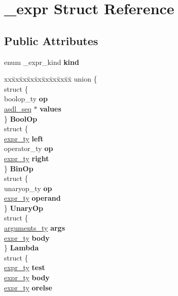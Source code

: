 \hypertarget{struct__expr}{}\section{\+\_\+expr Struct Reference}
\label{struct__expr}
\subsection*{Public Attributes}
\begin{DoxyCompactItemize}
\item 
enum \+\_\+expr\+\_\+kind {\bfseries kind}\hypertarget{struct__expr_a588eb2205de8b0b03e0edd5143a26cd0}{}\label{struct__expr_a588eb2205de8b0b03e0edd5143a26cd0}

\item 
\begin{tabbing}
xx\=xx\=xx\=xx\=xx\=xx\=xx\=xx\=xx\=\kill
union \{\\
\>struct \{\\
\>\>boolop\_ty {\bfseries op}\\
\>\>\hyperlink{structasdl__seq}{asdl\_seq} $\ast$ {\bfseries values}\\
\>\} {\bfseries BoolOp}\\
\>struct \{\\
\>\>\hyperlink{struct__expr}{expr\_ty} {\bfseries left}\\
\>\>operator\_ty {\bfseries op}\\
\>\>\hyperlink{struct__expr}{expr\_ty} {\bfseries right}\\
\>\} {\bfseries BinOp}\\
\>struct \{\\
\>\>unaryop\_ty {\bfseries op}\\
\>\>\hyperlink{struct__expr}{expr\_ty} {\bfseries operand}\\
\>\} {\bfseries UnaryOp}\\
\>struct \{\\
\>\>\hyperlink{struct__arguments}{arguments\_ty} {\bfseries args}\\
\>\>\hyperlink{struct__expr}{expr\_ty} {\bfseries body}\\
\>\} {\bfseries Lambda}\\
\>struct \{\\
\>\>\hyperlink{struct__expr}{expr\_ty} {\bfseries test}\\
\>\>\hyperlink{struct__expr}{expr\_ty} {\bfseries body}\\
\>\>\hyperlink{struct__expr}{expr\_ty} {\bfseries orelse}\\

\end{tabbing}
\end{DoxyCompactItemize}
